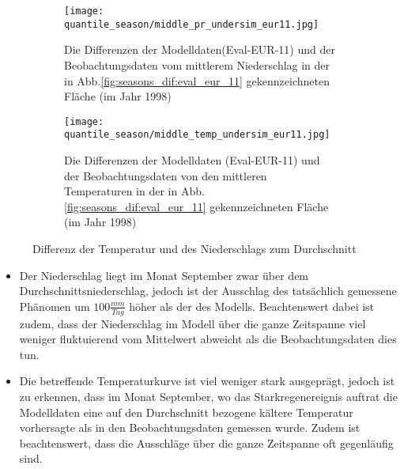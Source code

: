 \begin{figure}[h]
	\begin{subfigure}{0.49\textwidth}
		\texttt{[image: quantile\_season/middle\_pr\_undersim\_eur11.jpg]}
		\caption{Die Differenzen der Modelldaten(Eval-EUR-11) und der Beobachtungsdaten vom mittlerem Niederschlag in der in Abb.\ref{fig:seasons_dif:eval_eur_11} gekennzeichneten Fläche (im Jahr 1998)}
	\end{subfigure}
	\begin{subfigure}{0.49\textwidth}
		\texttt{[image: quantile\_season/middle\_temp\_undersim\_eur11.jpg]}
		\caption{Die Differenzen der Modelldaten (Eval-EUR-11) und der Beobachtungsdaten von den mittleren Temperaturen in der in Abb.\ref{fig:seasons_dif:eval_eur_11} gekennzeichneten Fläche (im Jahr 1998)}
	\end{subfigure}
	\caption{Differenz der Temperatur und des Niederschlags zum Durchschnitt}
	\label{fig:seasons:undersim_eval_eur11}
\end{figure}
\begin{itemize}
	\item Der Niederschlag liegt im Monat September zwar über dem Durchschnittsniederschlag, jedoch ist der Ausschlag des tatsächlich gemessene Phänomen um $100\frac{mm}{Tag}$ höher als der des Modells. Beachtenswert dabei ist zudem, dass der Niederschlag im Modell über die ganze Zeitspanne viel weniger fluktuierend vom Mittelwert abweicht als die Beobachtungsdaten dies tun.
	\item Die betreffende Temperaturkurve ist viel weniger stark ausgeprägt, jedoch ist zu erkennen, dass im Monat September, wo das Starkregenereignis auftrat die Modelldaten eine auf den Durchschnitt bezogene kältere Temperatur vorhersagte als in den Beobachtungsdaten gemessen wurde. Zudem ist beachtenswert, dass die Ausschläge über die ganze Zeitspanne oft gegenläufig sind.
\end{itemize}

